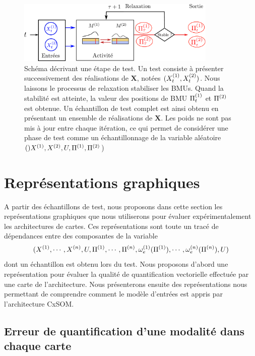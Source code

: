 \documentclass[../main]{subfiles}
\begin{document}
\begin{figure}
\centering
\includegraphics[width=0.85\textwidth]{tests_2maps.pdf}
\caption{Schéma décrivant une étape de test. Un test consiste à présenter successivement des réalisations de $\mathbf{X}$, notées $(X^{({1})}_t,X^{({2})}_t)$. Nous laissons le processus de relaxation stabiliser les BMUs. Quand la stabilité est atteinte, la valeur des positions de BMU $\Pi^{({1})}_t$ et $\Pi^{({2})}$ est obtenue. Un échantillon de test complet est ainsi obtenu en présentant un ensemble de réalisations de $\mathbf{X}$. Les poids ne sont pas mis à jour entre chaque itération, ce qui permet de considérer une phase de test comme un échantillonnage de la variable aléatoire $()X^{({1})},X^{({2})}, U, \Pi^{({1})}, \Pi^{({2})}$) }
\label{fig:flowchart}
\end{figure}

\section{Représentations graphiques}
A partir des échantillons de test, nous proposons dans cette section les représentations graphiques que nous utiliserons pour évaluer expérimentalement les architectures de cartes.
Ces représentations sont toute un tracé de dépendances entre des composantes de la variable $$(X^{({1})}, \cdots, X^{({n})}, U, \Pi^{({1})}, \cdots, \Pi^{({n})}, \omega_e^{({1})}(\Pi^{({1})}), \cdots, \omega_e^{({n})}(\Pi^{({n})}),U)$$ dont un échantillon est obtenu lors du test.
Nous proposons d'abord une représentation pour évaluer la qualité de quantification vectorielle effectuée par une carte de l'architecture. Nous présenterons ensuite des représentations nous permettant de comprendre comment le modèle d'entrées est appris par l'architecture CxSOM.

\subsection{Erreur de quantification d'une modalité dans chaque carte}
\end{document}
